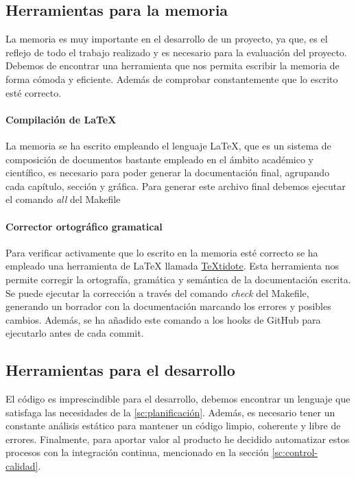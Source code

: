 \subsection{Herramientas para la memoria}
La memoria es muy importante en el desarrollo de un proyecto, ya que, es el reflejo de todo el trabajo realizado y es necesario para la evaluación del proyecto.
Debemos de encontrar una herramienta que nos permita escribir la memoria de forma cómoda y eficiente. Además de comprobar constantemente que lo escrito esté correcto.

\paragraph*{Compilación de LaTeX}
La memoria se ha escrito empleando el lenguaje LaTeX, que es un sistema de composición de documentos bastante empleado
en el ámbito académico y científico, es necesario para poder generar la documentación final, agrupando cada capítulo, sección y
gráfica. Para generar este archivo final debemos ejecutar el comando \textit{all} del Makefile

\paragraph*{Corrector ortográfico gramatical}
Para verificar activamente que lo escrito en la memoria esté correcto se ha empleado una herramienta de LaTeX llamada \href{https://github.com/sylvainhalle/textidote}{TeXtidote}.
Esta herramienta nos permite corregir la ortografía, gramática y semántica de la documentación escrita. Se puede ejecutar la corrección a través del comando \textit{check} del Makefile,
generando un borrador con la documentación marcando los errores y posibles cambios. Además, se ha añadido este comando a los hooks de GitHub para ejecutarlo antes de cada commit.

\subsection{Herramientas para el desarrollo}
El código es imprescindible para el desarrollo, debemos encontrar un lenguaje que satisfaga las necesidades de la \ref{sc:planificación}.
Además, es necesario tener un constante análisis estático para mantener un código limpio, coherente y libre de errores.
Finalmente, para aportar valor al producto he decidido automatizar estos procesos con la integración continua, mencionado en la sección \ref{sc:control-calidad}.

